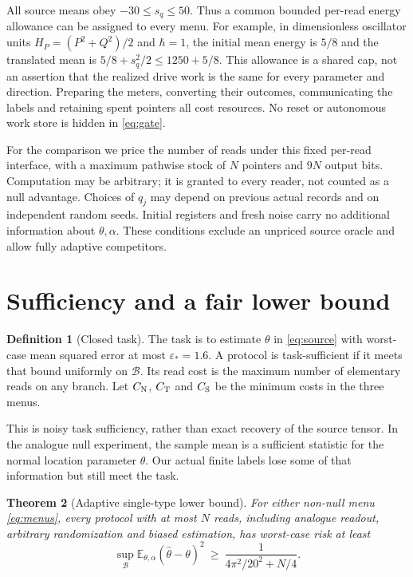 \documentclass[12pt,a4paper]{article}
\newtheorem{theorem}{Theorem}[section]
\theoremstyle{definition}
\newtheorem{definition}[theorem]{Definition}
\newcommand{\E}{\mathbb E}
\begin{document}
All source means obey $-30\leq s_q\leq50$. Thus a common bounded
per-read energy allowance can be assigned to every menu. For example, in
dimensionless oscillator units $H_P=(P^2+Q^2)/2$ and $\hbar=1$, the initial
mean energy is $5/8$ and the translated mean is $5/8+s_q^2/2\leq1250+5/8$.
This allowance is a shared cap, not an assertion that the realized drive
work is the same for every parameter and direction. Preparing the meters,
converting their outcomes, communicating the labels and retaining spent
pointers all cost resources. No reset or autonomous work store is hidden
in \eqref{eq:gate}.

For the comparison we price the number of reads under this fixed
per-read interface, with a maximum pathwise stock of $N$ pointers and
$9N$ output bits. Computation may be arbitrary; it is granted to every
reader, not counted as a null advantage. Choices of $q_j$ may depend on
previous actual records and on independent random seeds. Initial registers
and fresh noise carry no additional information about $\theta,\alpha$.
These conditions exclude an unpriced source oracle and allow fully
adaptive competitors.

\section{Sufficiency and a fair lower bound}
\label{sec:comparison}

\begin{definition}[Closed task]
The task is to estimate $\theta$ in \eqref{eq:source} with worst-case mean
squared error at most $\varepsilon_*=1.6$. A protocol is task-sufficient if
it meets that bound uniformly on $\mathcal B$. Its read cost is the
maximum number of elementary reads on any branch. Let $C_{\rm N}$,
$C_{\rm T}$ and $C_{\rm S}$ be the minimum costs in the three menus.
\end{definition}

This is noisy task sufficiency, rather than exact recovery of the source
tensor. In the analogue null experiment, the sample mean is a sufficient
statistic for the normal location parameter $\theta$. Our actual finite
labels lose some of that information but still meet the task.

\begin{theorem}[Adaptive single-type lower bound]
\label{thm:lower}
For either non-null menu \eqref{eq:menus}, every protocol with at most $N$
reads, including analogue readout, arbitrary randomization and biased
estimation, has worst-case risk at least
\begin{equation}
 \sup_{\mathcal B}\E_{\theta,\alpha}(\widehat\theta-\theta)^2
 \ \geq\ \frac{1}{4\pi^2/20^2+N/4}.
 \label{eq:lower}
\end{equation}
\end{theorem}
\end{document}
